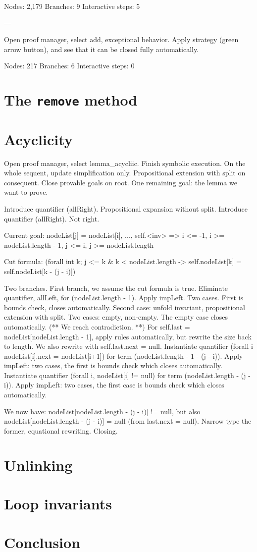 \documentclass[runningheads]{llncs}
\begin{document}
Nodes: 2,179
Branches: 9
Interactive steps: 5

---

Open proof manager, select add, exceptional behavior. Apply strategy (green arrow button), and see that it can be closed fully automatically.

Nodes: 217
Branches: 6
Interactive steps: 0

\section{The \texttt{remove} method}\label{sec:remove}
\section{Acyclicity}\label{sec:acyclicity}

Open proof manager, select lemma\_acycliic. Finish symbolic execution. On the whole sequent, update simplification only. Propositional extension with split on consequent. Close provable goals on root. One remaining goal: the lemma we want to prove.

Introduce quantifier (allRight). Propositional expansion without split. Introduce quantifier (allRight). Not right.

Current goal:
nodeList[j] = nodeList[i], ..., self.<inv> => i <= -1, i >= nodeList.length - 1, j <= i, j >= nodeList.length

Cut formula:
(forall int k; j <= k & k < nodeList.length -> self.nodeList[k] = self.nodeList[k - (j - i)])

Two branches. First branch, we assume the cut formula is true. Eliminate quantifier, allLeft, for (nodeList.length - 1). Apply impLeft. Two cases. First is bounds check, closes automatically. Second case: unfold invariant, propositional extension with split. Two cases: empty, non-empty. The empty case closes automatically. (** We reach contradiction. **) For self.last = nodeList[nodeList.length - 1], apply rules automatically, but rewrite the size back to length. We also rewrite with self.last.next = null. Instantiate quantifier (forall i nodeList[i].next = nodeList[i+1]) for term (nodeList.length - 1 - (j - i)). Apply impLeft: two cases, the first is bounds check which closes automatically. Instantiate quantifier (forall i, nodeList[i] != null) for term (nodeList.length - (j - i)). Apply impLeft: two cases, the first case is bounds check which closes automatically.

We now have: nodeList[nodeList.length - (j - i)] != null, but also nodeList[nodeList.length - (j - i)] = null (from last.next = null). Narrow type the former, equational rewriting. Closing.

\section{Unlinking}\label{sec:unlinking}
\section{Loop invariants}\label{sec:loop-invariant}
\section{Conclusion}\label{sec:conclusion}



\end{document}
